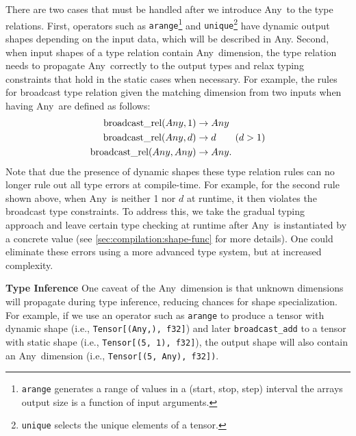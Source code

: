 There are two cases that must be handled after we introduce Any~to the type relations.
First, operators such as {\tt arange}\footnote{{\tt arange} generates a range of values in a (start, stop, step) interval the arrays output size is a function of input arguments.} and {\tt unique}\footnote{{\tt unique} selects the unique elements of a tensor.} have dynamic output shapes depending on the input data, which will be described in Any.
Second, when input shapes of a type relation contain Any~dimension, the type relation needs to propagate Any~correctly to the output types and relax typing constraints that hold in the static cases when necessary.
For example, the rules
for broadcast type relation given the matching dimension from two inputs when having Any~are defined as follows:
\vspace{-6pt}
\begin{align*}
  \textrm{broadcast\_rel}(Any, 1) &\rightarrow Any \\
  \textrm{broadcast\_rel}(Any, d) &\rightarrow d ~~~~~~(d > 1) \\
  \textrm{broadcast\_rel}(Any, Any) &\rightarrow Any.
  \vspace{-12pt}
\end{align*}
Note that due the presence of dynamic shapes these type relation rules can no longer rule out all type errors at compile-time.
For example, for the second rule shown above, when Any~is neither 1 nor $d$ at runtime, it then violates the broadcast type constraints.
To address this, we take the gradual typing~\citep{gradualtyping} approach and leave certain type checking at runtime after Any~is instantiated by a
concrete value (see \autoref{sec:compilation:shape-func} for more details).
One could eliminate these errors using a more advanced type system, but at increased complexity.

\noindent
{\bf Type Inference} One caveat of the Any~dimension is that unknown dimensions will propagate during type inference, reducing chances for shape specialization.
For example, if we use an operator such as {\tt arange} to produce a tensor with dynamic shape (i.e., \texttt{Tensor[(Any,), f32]}) and later {\tt broadcast\_add} to a tensor with static shape (i.e., \texttt{Tensor[(5, 1), f32]}), the output shape will also contain an Any~dimension (i.e., \texttt{Tensor[(5, Any), f32])}.

